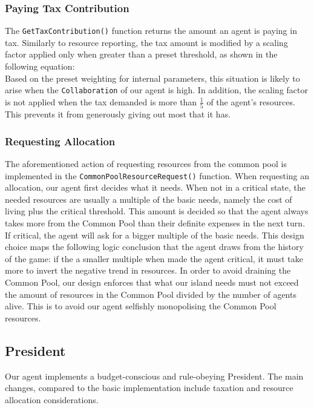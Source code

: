 \subsubsection{Paying Tax Contribution}
The \texttt{GetTaxContribution()} function returns the amount an agent is paying in tax. Similarly to resource reporting, the tax amount is modified by a scaling factor applied only when greater than a preset threshold, as shown in the following equation: 
\begin{equation}
    [1 + (Scaling \: Factor - Preset \: Threshold)]
\end{equation}
Based on the preset weighting for internal parameters, this situation is likely to arise when the \texttt{Collaboration} of our agent is high. In addition, the scaling factor is not applied when the tax demanded is more than $\frac{1}{5}$ of the agent's resources. This prevents it from generously giving out most that it has.

\subsubsection{Requesting Allocation}\label{subsubsection:CommonPoolResourceRequest()}
The aforementioned action of requesting resources from the common pool is implemented in the \texttt{CommonPoolResourceRequest()} function. When requesting an allocation, our agent first decides what it needs. When not in a critical state, the needed resources are usually a multiple of the basic needs, namely the cost of living plus the critical threshold. This amount is decided so that the agent always takes more from the Common Pool than their definite expenses in the next turn. If critical, the agent will ask for a bigger multiple of the basic needs. This design choice maps the following logic conclusion that the agent draws from the history of the game: if the a smaller multiple when made the agent critical, it must take more to invert the negative trend in resources. In order to avoid draining the Common Pool, our design enforces that what our island needs must not exceed the amount of resources in the Common Pool divided by the number of agents alive. This is to avoid our agent selfishly monopolising the Common Pool resources.

\subsection{President}
\label{subsec:team4:president}
Our agent implements a budget-conscious and rule-obeying President. The main changes, compared to the basic implementation include taxation and resource allocation considerations.

